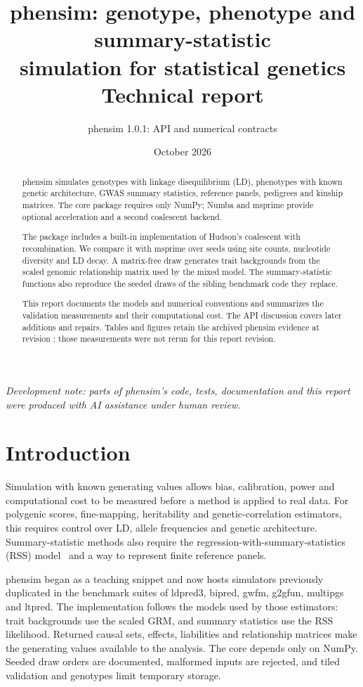 \documentclass[11pt,a4paper]{article}
\title{\textbf{phensim}: genotype, phenotype and summary-statistic\\
simulation for statistical genetics\\[0.4em]\large Technical report}
\author{phensim 1.0.1: API and numerical contracts}
\date{October 2026}
\begin{document}
\maketitle

\begin{abstract}
\noindent phensim simulates genotypes with linkage disequilibrium (LD),
phenotypes with known genetic architecture, GWAS summary statistics,
reference panels, pedigrees and kinship matrices. The core package requires
only NumPy; Numba and msprime provide optional acceleration and a second
coalescent backend.

The package includes a built-in implementation of Hudson's coalescent with
recombination. We compare it with msprime over \PhCoalSeeds{} seeds using
site counts, nucleotide diversity and LD decay. A matrix-free draw generates
trait backgrounds from the scaled genomic relationship matrix used by the
mixed model. The summary-statistic functions also reproduce the seeded
draws of the sibling benchmark code they replace.

This report documents the models and numerical conventions and summarizes
the validation measurements and their computational cost. The API discussion
covers later additions and repairs. Tables and figures retain the archived
phensim \PhVersion{} evidence at revision \texttt{\PhRevision}; those
measurements were not rerun for this report revision.
\end{abstract}

\vspace{0.3em}
\noindent\small\emph{Development note: parts of phensim's code, tests,
documentation and this report were produced with AI assistance under human
review.}

\section{Introduction}
Simulation with known generating values allows bias, calibration, power and
computational cost to be measured before a method is applied to real data.
For polygenic scores, fine-mapping, heritability and genetic-correlation
estimators, this requires control over LD, allele frequencies and genetic
architecture. Summary-statistic methods also require the
regression-with-summary-statistics (RSS) model~\cite{zhu2017} and a way to
represent finite reference panels.

phensim began as a teaching snippet and now hosts simulators previously
duplicated in the benchmark suites of ldpred3, bipred, gwfm, g2gfun,
multipgs and ltpred. The implementation follows the models used by those
estimators: trait backgrounds use the scaled GRM, and summary statistics
use the RSS likelihood. Returned causal sets, effects, liabilities and
relationship matrices make the generating values available to the analysis.
The core depends only on NumPy. Seeded draw orders are documented, malformed
inputs are rejected, and tiled validation and  genotypes limit
temporary storage.
\end{document}
